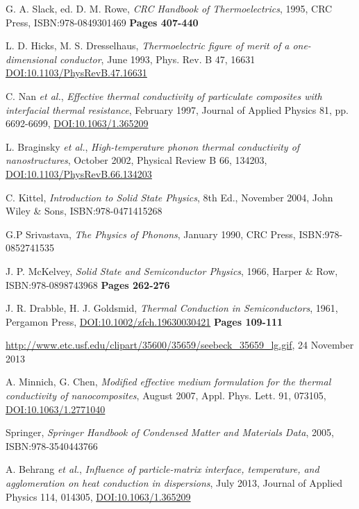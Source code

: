 \documentclass[12pt]{article}
\begin{document}
\begin{thebibliography}{11}
G. A. Slack, ed. D. M. Rowe,
\emph{CRC Handbook of Thermoelectrics},
1995,
CRC Press,
ISBN:978-0849301469
\textbf{Pages 407-440}

L. D. Hicks, M. S. Dresselhaus,
\emph{Thermoelectric figure of merit of a one-dimensional conductor},
June 1993,
Phys. Rev. B 47, 16631
\href{http://dx.doi.org/10.1103/PhysRevB.47.16631}{DOI:10.1103/PhysRevB.47.16631}

C. Nan \emph{et al.},
\emph{Effective thermal conductivity of particulate composites with interfacial thermal resistance},
February 1997,
Journal of Applied Physics 81, pp. 6692-6699,
\href{http://dx.doi.org/10.1063/1.365209}{DOI:10.1063/1.365209}

L. Braginsky \emph{et al.},
\emph{High-temperature phonon thermal conductivity of nanostructures},
October 2002,
Physical Review B 66, 134203,
\href{http://dx.doi.org/10.1103/PhysRevB.66.134203}{DOI:10.1103/PhysRevB.66.134203}

C. Kittel,
\emph{Introduction to Solid State Physics}, 8th Ed.,
November 2004,
John Wiley \& Sons,
ISBN:978-0471415268

G.P Srivastava,
\emph{The Physics of Phonons},
January 1990,
CRC Press,
ISBN:978-0852741535

J. P. McKelvey,
\emph{Solid State and Semiconductor Physics},
1966,
Harper \& Row,
ISBN:978-0898743968
\textbf{Pages 262-276}

J. R. Drabble, H. J. Goldsmid,
\emph{Thermal Conduction in Semiconductors},
1961,
Pergamon Press,
\href{http://dx.doi.org/10.1002/zfch.19630030421}{DOI:10.1002/zfch.19630030421}
\textbf{Pages 109-111}

\url{http://www.etc.usf.edu/clipart/35600/35659/seebeck_35659_lg.gif},
24 November 2013

A. Minnich, G. Chen,
\emph{Modified effective medium formulation for the thermal conductivity of nanocomposites},
August 2007,
Appl. Phys. Lett. 91, 073105,
\href{http://dx.doi.org/10.1063/1.2771040}{DOI:10.1063/1.2771040}

Springer,
\emph{Springer Handbook of Condensed Matter and Materials Data},
2005,
ISBN:978-3540443766

A. Behrang \emph{et al.},
\emph{Influence of particle-matrix interface, temperature, and agglomeration on heat conduction in dispersions},
July 2013,
Journal of Applied Physics 114, 014305,
\href{http://dx.doi.org/10.1063/1.4812734}{DOI:10.1063/1.365209}

\end{thebibliography}
\end{document}
